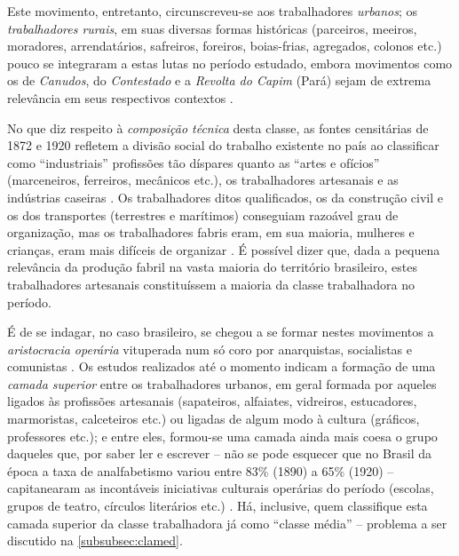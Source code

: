 Este movimento, entretanto, circunscreveu-se aos trabalhadores \textit{urbanos}; os \textit{trabalhadores rurais}, em suas diversas formas históricas (parceiros, meeiros, moradores, arrendatários, safreiros, foreiros, boias-frias, agregados, colonos etc.) pouco se integraram a estas lutas no período estudado, embora movimentos como os de \textit{Canudos}, do \textit{Contestado} e a \textit{Revolta do Capim} (Pará) sejam de extrema relevância em seus respectivos contextos \cite{mottazarth_rescamp1_2008}. 

No que diz respeito à \textit{composição técnica} desta classe, as fontes censitárias de 1872 e 1920 refletem a divisão social do trabalho existente no país ao classificar como ``industriais'' profissões tão díspares quanto as ``artes e ofícios'' (marceneiros, ferreiros, mecânicos etc.), os trabalhadores artesanais e as indústrias caseiras \cite[p.~141]{pinheiro_prolind_1977}. Os trabalhadores ditos qualificados, os da construção civil e os dos transportes (terrestres e marítimos) conseguiam razoável grau de organização, mas os trabalhadores fabris eram, em sua maioria, mulheres e crianças, eram mais difíceis de organizar \cite[p.~152]{pinheiro_prolind_1977}. É possível dizer que, dada a pequena relevância da produção fabril na vasta maioria do território brasileiro, estes trabalhadores artesanais constituíssem a maioria da classe trabalhadora no período.

É de se indagar, no caso brasileiro, se chegou a se formar nestes movimentos a \textit{aristocracia operária} vituperada num só coro por anarquistas, socialistas e comunistas \cite{bakunin_contramarx_2015,engels_1892pref_1990,lenin_imperialismo_1987}. Os estudos realizados até o momento indicam a formação de uma \textit{camada superior} entre os trabalhadores urbanos, em geral formada por aqueles ligados às profissões artesanais (sapateiros, alfaiates, vidreiros, estucadores, marmoristas, calceteiros etc.) ou ligadas de algum modo à cultura (gráficos, professores etc.); e entre eles, formou-se uma camada ainda mais coesa o grupo daqueles que, por saber ler e escrever -- não se pode esquecer que no Brasil da época a taxa de analfabetismo variou entre 83\% (1890) a 65\% (1920) -- capitanearam as incontáveis iniciativas culturais operárias do período (escolas, grupos de teatro, círculos literários etc.) \cite{gomes_velhos_1988,goes_formacao_1988,hardman_patripatr_2002,pinheiro_prolind_1977}. Há, inclusive, quem classifique esta camada superior da classe trabalhadora já como ``classe média'' -- problema a ser discutido na \autoref{subsubsec:clamed}.

